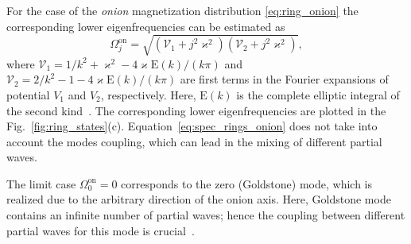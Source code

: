 For the case of the \textit{onion} magnetization distribution \eqref{eq:ring_onion} the corresponding lower eigenfrequencies can be estimated as~\cite{Sheka15}
\begin{equation}\label{eq:spec_rings_onion}
	\Omega^\text{on}_j = \sqrt{\left(\mathcal{V}_1+j^2\varkappa^2\right)\left(\mathcal{V}_2+j^2\varkappa^2\right)},
\end{equation}
where $\mathcal{V}_1 = 1/k^2 + \varkappa^2 - 4\varkappa\mathrm{E}(k) /\left(k\pi\right)$ and  $\mathcal{V}_2 = 2/k^2 - 1 - 4\varkappa\mathrm{E}(k) /\left(k\pi\right)$ are first terms in the Fourier expansions of potential $V_1$ and $V_2$, respectively. Here, $\mathrm{E}(k)$ is the complete elliptic integral of the second kind~\cite{NIST10}. The corresponding lower eigenfrequencies are plotted in the Fig.~\ref{fig:ring_states}(c). Equation~\eqref{eq:spec_rings_onion} does not take into account the modes coupling, which can lead in the mixing of different partial waves.

The limit case $\Omega^\text{on}_0 = 0$ corresponds to the zero (Goldstone) mode, which is realized due to the arbitrary direction of the onion axis. Here, Goldstone mode contains an infinite number of partial waves; hence the coupling between different partial waves for this mode is crucial~\cite{Sheka15}.